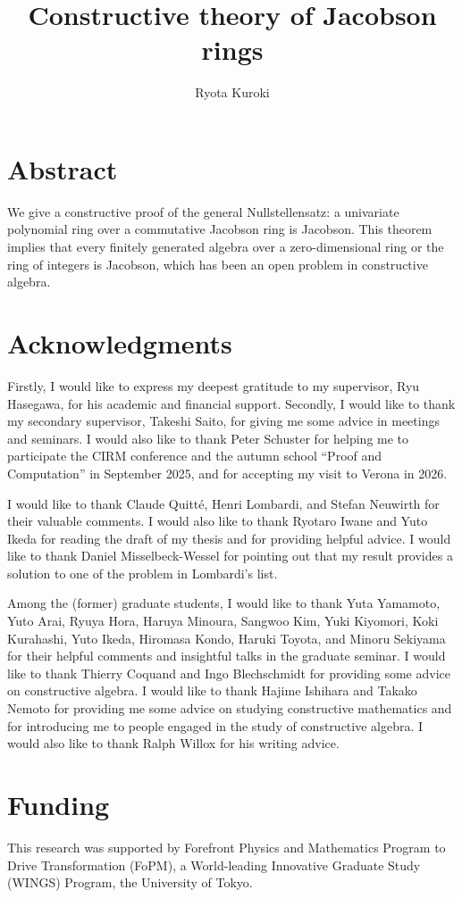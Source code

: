 \documentclass[11pt]{article}
\title{Constructive theory of Jacobson rings}
\author{Ryota Kuroki}
\affil{Graduate School of Mathematical Sciences, The University of Tokyo,\\3-8-1 Komaba, Meguro-ku, Tokyo, 153-8914, Japan}
\date{}
\theoremstyle{definition}
\begin{document}
\maketitle
\section*{Abstract}
We give a constructive proof of the general Nullstellensatz: a univariate polynomial ring over a commutative Jacobson ring is Jacobson. This theorem implies that every finitely generated algebra over a zero-dimensional ring or the ring of integers is Jacobson, which has been an open problem in constructive algebra.
\section*{Acknowledgments}
Firstly, I would like to express my deepest gratitude to my supervisor, Ryu Hasegawa, for his academic and financial support.
Secondly, I would like to thank my secondary supervisor, Takeshi Saito, for giving me some advice in meetings and seminars.
I would also like to thank Peter Schuster for helping me to participate the CIRM conference and the autumn school ``Proof and Computation'' in September 2025, and for accepting my visit to Verona in 2026.

I would like to thank Claude Quitté, Henri Lombardi, and Stefan Neuwirth for their valuable comments.
I would also like to thank Ryotaro Iwane and Yuto Ikeda for reading the draft of my thesis and for providing helpful advice.
I would like to thank Daniel Misselbeck-Wessel for pointing out that my result provides a solution to one of the problem in Lombardi's list.

Among the (former) graduate students, I would like to thank Yuta Yamamoto, Yuto Arai, Ryuya Hora, Haruya Minoura, Sangwoo Kim, Yuki Kiyomori, Koki Kurahashi, Yuto Ikeda, Hiromasa Kondo, Haruki Toyota, and Minoru Sekiyama for their helpful comments and insightful talks in the graduate seminar.
I would like to thank Thierry Coquand and Ingo Blechschmidt for providing some advice on constructive algebra.
I would like to thank Hajime Ishihara and Takako Nemoto for providing me some advice on studying constructive mathematics and for introducing me to people engaged in the study of constructive algebra.
I would also like to thank Ralph Willox for his writing advice.


\section*{Funding}
This research was supported by Forefront Physics and Mathematics Program to Drive Transformation (FoPM), a World-leading Innovative Graduate Study (WINGS) Program, the University of Tokyo.
\end{document}

